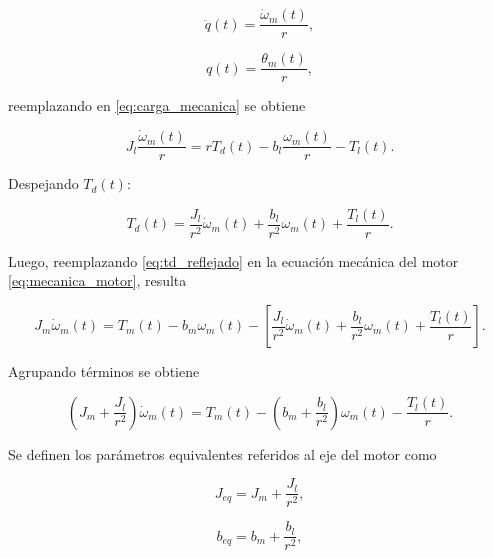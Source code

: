 \documentclass[10pt,a4paper]{article}
\begin{document}
\begin{equation}
    \ddot{q}(t)
    =
    \frac{\dot{\omega}_m(t)}{r},
\end{equation}

\begin{equation}
    q(t)
    =
    \frac{\theta_m(t)}{r},
\end{equation}

reemplazando en \eqref{eq:carga_mecanica} se obtiene

\begin{equation}
    J_l \frac{\dot{\omega}_m(t)}{r}
    =
    r T_d(t)
    -
    b_l \frac{\omega_m(t)}{r}
    -
    T_l(t).
    \label{eq:carga_referida_1}
\end{equation}

Despejando \(T_d(t)\):

\begin{equation}
    T_d(t)
    =
    \frac{J_l}{r^2}\dot{\omega}_m(t)
    +
    \frac{b_l}{r^2}\omega_m(t)
    +
    \frac{T_l(t)}{r}.
    \label{eq:td_reflejado}
\end{equation}

Luego, reemplazando \eqref{eq:td_reflejado} en la ecuación mecánica del motor \eqref{eq:mecanica_motor}, resulta

\begin{equation}
    J_m \dot{\omega}_m(t)
    =
    T_m(t)
    -
    b_m \omega_m(t)
    -
    \left[
    \frac{J_l}{r^2}\dot{\omega}_m(t)
    +
    \frac{b_l}{r^2}\omega_m(t)
    +
    \frac{T_l(t)}{r}
    \right].
    \label{eq:sustitucion_motor}
\end{equation}

Agrupando términos se obtiene

\begin{equation}
    \left(
    J_m+
    \frac{J_l}{r^2}
    \right)
    \dot{\omega}_m(t)
    =
    T_m(t)
    -
    \left(
    b_m+
    \frac{b_l}{r^2}
    \right)
    \omega_m(t)
    -
    \frac{T_l(t)}{r}.
    \label{eq:modelo_eq_preliminar}
\end{equation}

Se definen los parámetros equivalentes referidos al eje del motor como

\begin{equation}
    J_{eq}
    =
    J_m+
    \frac{J_l}{r^2},
    \label{eq:jeq}
\end{equation}

\begin{equation}
    b_{eq}
    =
    b_m+
    \frac{b_l}{r^2},
    \label{eq:beq}
\end{equation}
\end{document}
